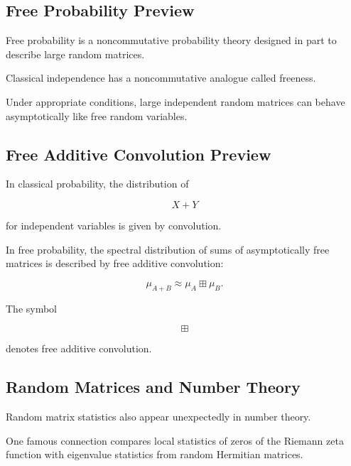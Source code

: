 \subsection{Free Probability Preview}
\label{subsec:free-probability-preview}

Free probability is a noncommutative probability theory designed in
part to describe large random matrices.

Classical independence has a noncommutative analogue called freeness.

Under appropriate conditions, large independent random matrices can
behave asymptotically like free random variables.

\subsection{Free Additive Convolution Preview}
\label{subsec:free-additive-convolution}

In classical probability, the distribution of

\[
X+Y
\]

for independent variables is given by convolution.

In free probability, the spectral distribution of sums of asymptotically
free matrices is described by free additive convolution:

\[
\boxed{
\mu_{A+B}
\approx
\mu_A
\boxplus
\mu_B.
}
\]

The symbol

\[
\boxplus
\]

denotes free additive convolution.

\subsection{Random Matrices and Number Theory}
\label{subsec:rmt-number-theory}

Random matrix statistics also appear unexpectedly in number theory.

One famous connection compares local statistics of zeros of the Riemann
zeta function with eigenvalue statistics from random Hermitian matrices.

